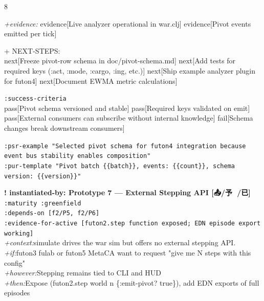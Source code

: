 \documentclass[landscape]{article}
\newcommand{\flexitag}[1]{\textcolor[gray]{0.35}{\textit{#1}}}
\newenvironment{devmapgreenfield}{%
  \def\FrameCommand{\colorbox{devmapgreenfieldbg}}%
  \setlength{\fboxsep}{2pt}%
  \MakeFramed{\advance\hsize-\width \FrameRestore}%
}{\endMakeFramed}
\begin{document}
\begin{paracol}{8}
\begin{devmapgreenfield}
  \flexitag{+evidence:} evidence[Live analyzer operational in war.clj] evidence[Pivot events emitted per tick]\\
\par
  + NEXT-STEPS:\\
    next[Freeze pivot-row schema in doc/pivot-schema.md] next[Add tests for required keys (:act, :mode, :cargo, :ing, etc.)] next[Ship example analyzer plugin for futon4] next[Document EWMA metric calculations]\\
\par
  \texttt{:\allowbreak{}success-\allowbreak{}criteria}\\
    pass[Pivot schema versioned and stable] pass[Required keys validated on emit] pass[External consumers can subscribe without internal knowledge] fail[Schema changes break downstream consumers]\\
\par
  \texttt{:\allowbreak{}psr-\allowbreak{}example "Selected pivot schema for futon4 integration because event bus stability enables composition"}\\
  \texttt{:\allowbreak{}pur-\allowbreak{}template "Pivot batch \{\{batch\}\},\allowbreak{} events:\allowbreak{} \{\{count\}\},\allowbreak{} schema version:\allowbreak{} \{\{version\}\}"}\\
\par
\par
\end{devmapgreenfield}
\begin{devmapgreenfield}
\textbf{! instantiated-by: Prototype 7 — External Stepping API [📤/予 🚢/已]}\\
  \texttt{:\allowbreak{}maturity :\allowbreak{}greenfield}\\
  \texttt{:\allowbreak{}depends-\allowbreak{}on [f2/\allowbreak{}P5,\allowbreak{} f2/\allowbreak{}P6]}\\
  \texttt{:\allowbreak{}evidence-\allowbreak{}for-\allowbreak{}active [futon2.step function exposed;\allowbreak{} EDN episode export working]}\\
  \flexitag{+context:}simulate drives the war sim but offers no external stepping API.\\
  \flexitag{+if:}futon3 fulab or futon5 MetaCA want to request "give me N steps with this config"\\
  \flexitag{+however:}Stepping remains tied to CLI and HUD\\
  \flexitag{+then:}Expose (futon2.step world n \{:emit-pivot? true\}), add EDN exports of full episodes\\

\end{devmapgreenfield}
\end{paracol}
\end{document}
